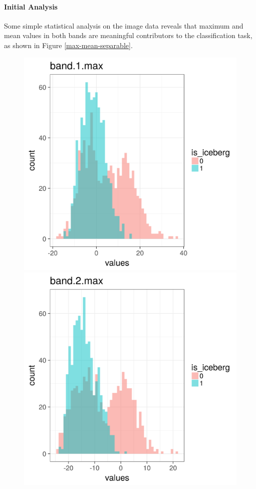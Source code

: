 \documentclass[fleqn,10pt]{SelfArx} %
\begin{document}
\paragraph{Initial Analysis} Some simple statistical analysis on the image data reveals that maximum and mean values in both bands are meaningful contributors to the classification task, as shown in Figure \ref{max-mean-separable}.

\begin{figure}[ht]
	\centering
	\begin{minipage}{0.24\textwidth}
		\includegraphics[scale=0.2]{iceberg/analysis/band_1_max.png}
	\end{minipage}%
	\begin{minipage}{0.24\textwidth}
		\includegraphics[scale=0.2]{iceberg/analysis/band_2_max.png}

\end{minipage}
\end{figure}
\end{document}
